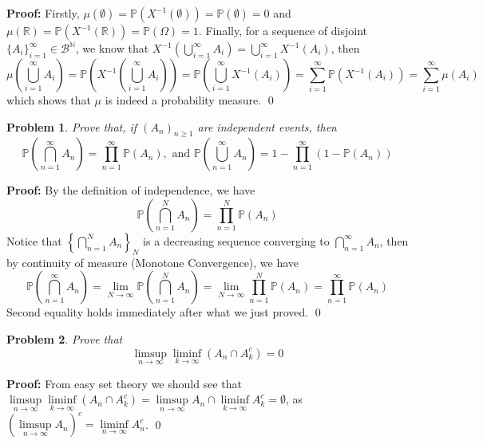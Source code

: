 \documentclass[12pt]{article}
\newtheorem{problem}{Problem}
\begin{document}
\textbf{Proof:} Firstly, $\mu(\emptyset)=\mathbb{P}(X^{-1}(\emptyset))=\mathbb{P}(\emptyset)=0$ and $\mu(\mathbb{R})=\mathbb{P}(X^{-1}(\mathbb{R}))=\mathbb{P}(\Omega)=1$. Finally, for a sequence of disjoint $\{A_i\}_{i=1}^\infty\in\mathcal{B}^\mathbb{N}$, we know that $X^{-1}\left(\bigcup\limits_{i=1}^\infty A_i\right)=\bigcup\limits_{i=1}^\infty X^{-1}(A_i)$, then
$$
    \mu\left(\bigcup_{i=1}^\infty A_i\right)=\mathbb{P}\left(X^{-1}\left(\bigcup_{i=1}^\infty A_i\right)\right)=\mathbb{P}\left(\bigcup_{i=1}^\infty X^{-1}(A_i)\right)=\sum\limits_{i=1}^\infty\mathbb{P}(X^{-1}(A_i))=\sum\limits_{i=1}^\infty \mu(A_i)
$$
which shows that $\mu$ is indeed a probability measure. \qed
\\
\begin{problem}
    Prove that, if $(A_n)_{n\geq 1}$ are independent events, then
    $$
        \mathbb{P}\left(\bigcap_{n=1}^\infty A_n\right)=\prod\limits_{n=1}^\infty\mathbb{P}(A_n), \text{ and } \mathbb{P}\left(\bigcup_{n=1}^\infty A_n\right)=1-\prod\limits_{n=1}^\infty(1-\mathbb{P}(A_n))
    $$
\end{problem}

\textbf{Proof:} By the definition of independence, we have 
$$
    \mathbb{P}\left(\bigcap_{n=1}^N A_n\right)=\prod\limits_{n=1}^N\mathbb{P}(A_n)
$$
Notice that $\left\{\bigcap\limits_{n=1}^N A_n\right\}_N$ is a decreasing sequence converging to $\bigcap\limits_{n=1}^\infty A_n$, then by continuity of measure (Monotone Convergence), we have 
$$
    \mathbb{P}\left(\bigcap_{n=1}^\infty A_n\right)=\lim\limits_{N\to\infty}\mathbb{P}\left(\bigcap_{n=1}^N A_n\right)=\lim\limits_{N\to\infty}\prod\limits_{n=1}^N\mathbb{P}(A_n)=\prod\limits_{n=1}^\infty\mathbb{P}(A_n)
$$
Second equality holds immediately after what we just proved. \qed
\\
\begin{problem}
    Prove that 
    $$
        \limsup\limits_{n\to\infty}\liminf\limits_{k\to\infty}(A_n\cap A_k^c)=0
    $$
\end{problem}

\textbf{Proof:} From easy set theory we should see that $\limsup\limits_{n\to\infty}\liminf\limits_{k\to\infty}(A_n\cap A_k^c)=\limsup\limits_{n\to\infty}A_n\cap\liminf\limits_{k\to\infty}A_k^c=\emptyset$, as $(\limsup\limits_{n\to\infty} A_n)^c=\liminf\limits_{n\to\infty}A_n^c$. \qed
\end{document}
